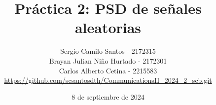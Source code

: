 \documentclass{journal}[IEEEtran, twocolumn]             %
\newcommand{\dochead}{Práctica 2}
\newcommand{\docsubhead}{PSD de señales aleatorias}
\newcommand{\titulo}{\dochead: \docsubhead}
\newcommand{\fecha}{8 de septiembre de 2024}
\begin{document}

\title{\textbf{\titulo}}            %

\author{
Sergio Camilo Santos - 2172315\\
Brayan Julian Niño Hurtado - 2172301\\
Carlos Alberto Cetina - 2215583\\
\href{https://github.com/scsantosdth/CommunicationsII_2024_2_scb.git}{https://github.com/scsantosdth/CommunicationsII_2024_2_scb.git}
}


\date{\fecha}                       %

\maketitle                          %
\thispagestyle{fancy}               %

%


\color{black}
\end{document}
